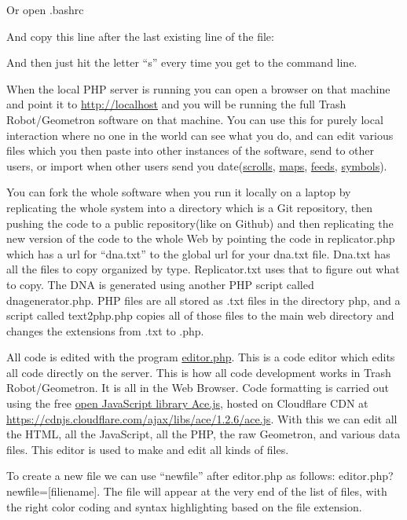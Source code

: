 Or open .bashrc

And copy this line after the last existing line of the file:

And then just hit the letter ``s'' every time you get to the command
line.

When the local PHP server is running you can open a browser on that
machine and point it to \href{http://localhost/}{http://localhost} and
you will be running the full Trash Robot/Geometron software on that
machine. You can use this for purely local interaction where no one in
the world can see what you do, and can edit various files which you then
paste into other instances of the software, send to other users, or
import when other users send you
date(\href{scrolls/scrolls.md}{scrolls}, \href{scrolls/maps.md}{maps},
\href{scrolls/feeds.md}{feeds}, \href{scrolls/geometron.md}{symbols}).

You can fork the whole software when you run it locally on a laptop by
replicating the whole system into a directory which is a Git repository,
then pushing the code to a public repository(like on Github) and then
replicating the new version of the code to the whole Web by pointing the
code in replicator.php which has a url for ``dna.txt'' to the global url
for your dna.txt file. Dna.txt has all the files to copy organized by
type. Replicator.txt uses that to figure out what to copy. The DNA is
generated using another PHP script called dnagenerator.php. PHP files
are all stored as .txt files in the directory php, and a script called
text2php.php copies all of those files to the main web directory and
changes the extensions from .txt to .php.

All code is edited with the program \url{editor.php}. This is a code
editor which edits all code directly on the server. This is how all code
development works in Trash Robot/Geometron. It is all in the Web
Browser. Code formatting is carried out using the free
\href{https://ace.c9.io/}{open JavaScript library Ace.js}, hosted on
Cloudflare CDN at
\url{https://cdnjs.cloudflare.com/ajax/libs/ace/1.2.6/ace.js}. With this
we can edit all the HTML, all the JavaScript, all the PHP, the raw
Geometron, and various data files. This editor is used to make and edit
all kinds of files.

To create a new file we can use ``newfile'' after editor.php as follows:
editor.php?newfile={[}filiename{]}. The file will appear at the very end
of the list of files, with the right color coding and syntax
highlighting based on the file extension.


